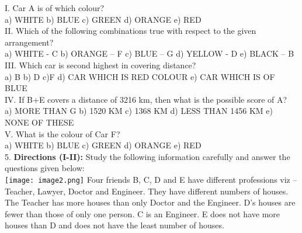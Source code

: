 \documentclass[
]{article}
\begin{document}
I. Car A is of which colour?\\
a) WHITE \hspace{2mm}b) BLUE \hspace{2mm}c) GREEN \hspace{2mm}d) ORANGE \hspace{2mm}e) RED\\

II. Which of the following combinations true with respect to the given arrangement?\\
a) WHITE - C \hspace{2mm}b) ORANGE – F \hspace{2mm}c) BLUE – G
\hspace{2mm}d) YELLOW - D \hspace{2mm}e) BLACK – B\\

III. Which car is second highest in covering distance?\\
a) B \hspace{2mm}b) D \hspace{2mm}c)F
\hspace{2mm}d) CAR WHICH IS RED COLOUR \hspace{2mm}e) CAR WHICH IS OF BLUE\\

IV. If B+E covers a distance of 3216 km, then what is the possible score of A?\\
a) MORE THAN G \hspace{2mm}b) 1520 KM \hspace{2mm}c) 1368 KM
\hspace{2mm}d) LESS THAN 1456 KM \hspace{2mm}e) NONE OF THESE\\

V. What is the colour of Car F?\\
a) WHITE \hspace{2mm}b) BLUE \hspace{2mm}c) GREEN \hspace{2mm}d) ORANGE \hspace{2mm}e) RED\\

5. \textbf{Directions (I-II):} Study the following information carefully and answer the questions given below:\\
\texttt{[image: image2.png]}
Four friends B, C, D and E have different professions viz – Teacher, Lawyer, Doctor
and Engineer. They have different numbers of houses. The Teacher has more houses than
only Doctor and the Engineer. D’s houses are fewer than those of only one person. C is an
Engineer. E does not have more houses than D and does not have the least number of houses.\\
\end{document}
